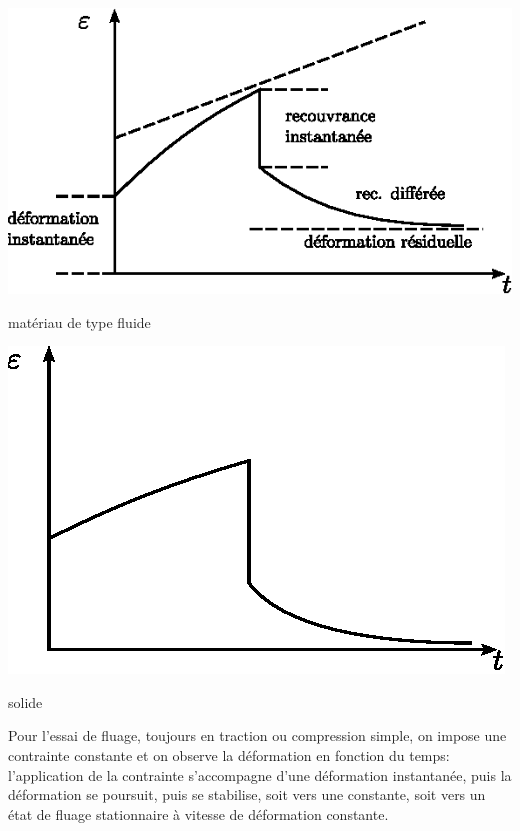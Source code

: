 \begin{multicols}{2}
    \begin{center}
        \includegraphics{../images/T1_Ch04-0017}

        matériau de type fluide
    \end{center}
    \columnbreak
    \begin{center}
        \includegraphics{../images/T1_Ch04-0018}

        solide
    \end{center}
\end{multicols}

Pour l'essai de fluage, toujours en traction ou compression simple, on impose une contrainte constante et on observe la déformation en fonction du temps: l'application de la contrainte s'accompagne d'une déformation instantanée, puis la déformation se poursuit, puis se stabilise, soit vers une constante, soit vers un état de fluage stationnaire à vitesse de déformation constante.


